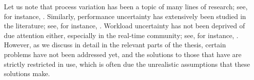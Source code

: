 Let us note that process variation has been a topic of many lines of research;
see, for instance, \cite{bhardwaj2006, bhardwaj2008, chandra2010, juan2012,
lee2013}. Similarly, performance uncertainty has extensively been studied in the
literature; see, for instance, \cite{coskun2006, huang2009b, das2014c}. Workload
uncertainty has not been deprived of due attention either, especially in the
real-time community; see, for instance, \cite{diaz2002, santinelli2011,
quinton2012, tanasa2015}. However, as we discuss in detail in the relevant parts
of the thesis, certain problems have not been addressed yet, and the solutions
to those that have are strictly restricted in use, which is often due the
unrealistic assumptions that these solutions make.
